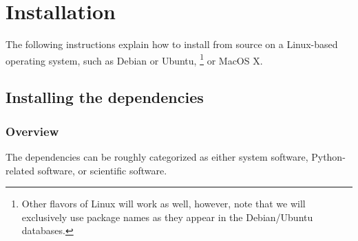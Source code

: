\chapter{Installation}

The following instructions explain how to install \ctg from source on a 
Linux-based operating system, such as Debian
or Ubuntu, \footnote{%
    Other flavors of Linux will work as well, however, note that
    we will exclusively use package names as they appear in the Debian/Ubuntu
     databases.
}
or MacOS X.

\section{Installing the dependencies}

\subsection{Overview}
\label{sec:inst:depend:overview}

The dependencies can be roughly categorized as either system software, Python-related
software, or scientific software.\\


